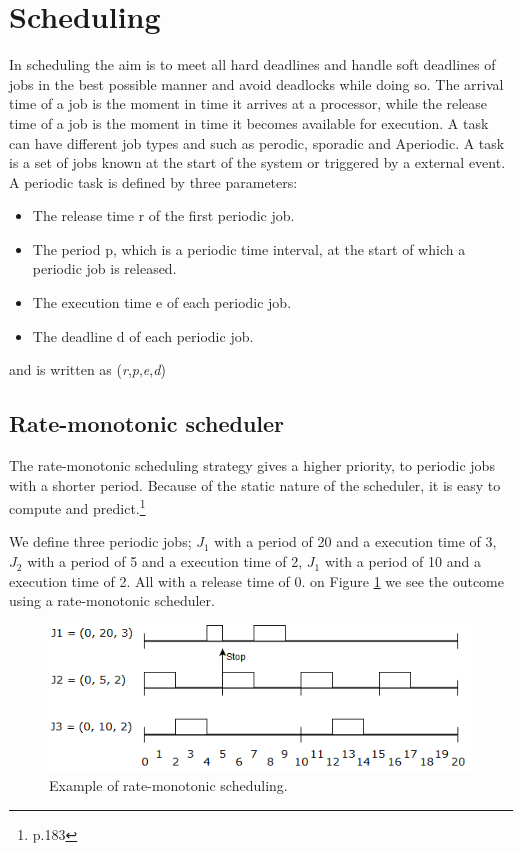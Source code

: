 \section{Scheduling} \label{sc:scheduling}
In scheduling the aim is to meet all hard deadlines and handle soft deadlines of jobs in the best possible manner and avoid deadlocks while doing so. The arrival time of a job is the moment in time it arrives at a processor, while the
release time of a job is the moment in time it becomes available for execution. A task can have different job types and such as perodic, sporadic and Aperiodic. A task is a set of jobs known at the start of the system or triggered by a external event.
A periodic task is defined by three parameters:
\begin{itemize}
	\itemsep0em
	\item The release time r of the first periodic job.
	\item The period p, which is a periodic time interval, at the start of which a periodic job is released.
	\item The execution time e of each periodic job.
	\item The deadline d of each periodic job.
\end{itemize}
and is written as (\textit{r},\textit{p},\textit{e},\textit{d})

\subsection{Rate-monotonic scheduler}
The rate-monotonic scheduling strategy gives a higher priority, to periodic jobs with a shorter period. Because of the static nature of the scheduler, it is easy to compute and predict.\footnote{\cite{Fokkink1965} p.183}


We define three periodic jobs; $J_1$ with a period of 20 and a execution time of 3, $J_2$ with a period of 5 and a execution time of 2, $J_1$ with a period of 10 and a execution time of 2. All with a release time of 0. on Figure \ref{fig:rateMonotonicExample} we see the outcome using a rate-monotonic scheduler.

\begin{figure}[h!]\label{}
	\centering
	\includegraphics[scale=0.5]{realTimeComputing/fig/rate-mono.png}
	\caption{Example of rate-monotonic scheduling.}
	\label{fig:rateMonotonicExample}
\end{figure}

